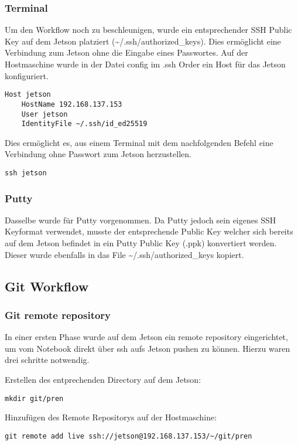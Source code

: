 \subsubsection{Terminal}
Um den Workflow noch zu beschleunigen, wurde ein entsprechender SSH Public Key auf dem Jetson platziert (\textasciitilde/.ssh/authorized\_keys). Dies ermöglicht eine Verbindung zum Jetson ohne die Eingabe eines Passwortes. Auf der Hostmaschine wurde in der Datei config im .ssh Order ein Host für das Jetson konfiguriert.

\begin{verbatim}
Host jetson
	HostName 192.168.137.153
	User jetson
	IdentityFile ~/.ssh/id_ed25519
\end{verbatim}

Dies ermöglicht es, aus einem Terminal mit dem nachfolgenden Befehl eine Verbindung ohne Passwort zum Jetson herzustellen.
\begin{verbatim}
ssh jetson
\end{verbatim}

\subsubsection{Putty}
Dasselbe wurde für Putty vorgenommen. Da Putty jedoch sein eigenes SSH Keyformat verwendet, musste der entsprechende Public Key welcher sich bereits auf dem Jetson befindet in ein Putty Public Key (.ppk) konvertiert werden. Dieser wurde ebenfalls in das File \textasciitilde/.ssh/authorized\_keys kopiert. 

\subsection{Git Workflow}
\subsubsection{Git remote repository}
In einer ersten Phase wurde auf dem Jetson ein remote repository eingerichtet, um vom Notebook direkt über ssh aufs Jetson pushen zu können. Hierzu waren drei schritte notwendig.

Erstellen des entprechenden Directory auf dem Jetson:
\begin{verbatim}
mkdir git/pren
\end{verbatim}


Hinzufügen des Remote Repositorys auf der Hostmaschine:
\begin{verbatim}
git remote add live ssh://jetson@192.168.137.153/~/git/pren
\end{verbatim}


